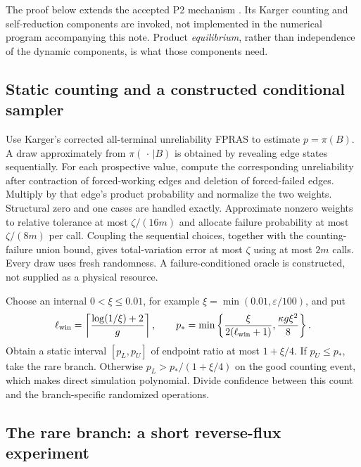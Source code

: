 \documentclass[10pt,a4paper]{article}
\theoremstyle{definition}\newtheorem{assumption}[theorem]{Assumption}
\newcommand{\eps}{\varepsilon}
\begin{document}
The proof below extends the accepted P2 mechanism \cite{p2}. Its Karger counting and self-reduction components are invoked, not implemented in the numerical program accompanying this note. Product \emph{equilibrium}, rather than independence of the dynamic components, is what those components need.

\subsection{Static counting and a constructed conditional sampler}

Use Karger's corrected all-terminal unreliability FPRAS \cite{karger} to estimate $p=\pi(B)$. A draw approximately from $\pi(\,\cdot\,|B)$ is obtained by revealing edge states sequentially. For each prospective value, compute the corresponding unreliability after contraction of forced-working edges and deletion of forced-failed edges. Multiply by that edge's product probability and normalize the two weights. Structural zero and one cases are handled exactly. Approximate nonzero weights to relative tolerance at most $\zeta/(16m)$ and allocate failure probability at most $\zeta/(8m)$ per call. Coupling the sequential choices, together with the counting-failure union bound, gives total-variation error at most $\zeta$ using at most $2m$ calls. Every draw uses fresh randomness. A failure-conditioned oracle is constructed, not supplied as a physical resource.

Choose an internal $0<\xi\le0.01$, for example $\xi=\min(0.01,\eps/100)$, and put
\begin{equation}
 \ell_{\rm win}=\left\lceil\frac{\log(1/\xi)+2}{g}\right\rceil,\qquad
 p_*=\min\left\{\frac{\xi}{2(\ell_{\rm win}+1)},
                       \frac{\kappa g\xi^2}{8}\right\}.
 \label{eq:threshold}
\end{equation}
Obtain a static interval $[p_L,p_U]$ of endpoint ratio at most $1+\xi/4$. If $p_U\le p_*$, take the rare branch. Otherwise $p_L>p_* /(1+\xi/4)$ on the good counting event, which makes direct simulation polynomial. Divide confidence between this count and the branch-specific randomized operations.

\subsection{The rare branch: a short reverse-flux experiment}
\end{document}
